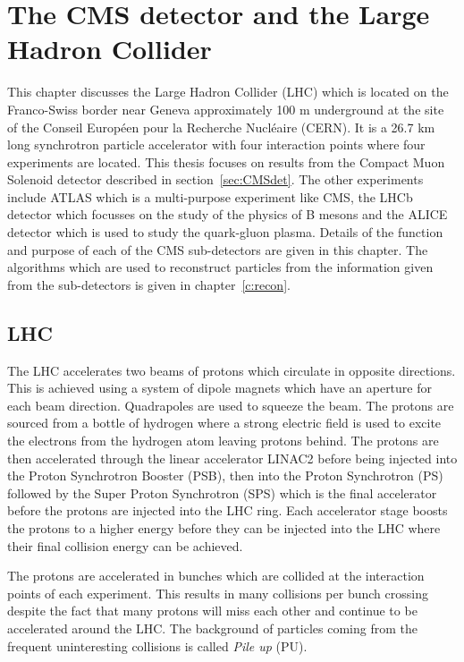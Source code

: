 \chapter{The CMS detector and the Large Hadron Collider}
\label{c:det}
This chapter discusses the Large Hadron Collider (LHC) which is located on the Franco-Swiss border near Geneva approximately 100 m underground at the site of the Conseil Europ\'{e}en pour la Recherche Nucl\'{e}aire (CERN). It is a 26.7 km long synchrotron particle accelerator with four interaction points where four experiments are located.  This thesis focuses on results from the Compact Muon Solenoid detector described in section~\ref{sec:CMSdet}. The other experiments include ATLAS which is a multi-purpose experiment like CMS, the LHCb detector which focusses on the study of the physics of B mesons and the ALICE detector which is used to study the quark-gluon plasma. Details of the function and purpose of each of the CMS sub-detectors are given in this chapter. The algorithms which are used to reconstruct particles from the information given from the sub-detectors is given in chapter~\ref{c:recon}.

\section{LHC}

The LHC accelerates two beams of protons which circulate in opposite directions.
This is achieved using a system of dipole magnets which have an aperture for each beam direction. Quadrapoles are used to squeeze the beam.
The protons are sourced from a bottle of hydrogen where a strong electric field is used to excite the electrons from the hydrogen atom leaving protons behind. The protons are then accelerated through the linear accelerator LINAC2 before being injected into the Proton Synchrotron Booster (PSB), then into the Proton Synchrotron (PS) followed by the Super Proton Synchrotron (SPS) which is the final accelerator before the protons are injected into the LHC ring. Each accelerator stage boosts the protons to a higher energy before they can be injected into the LHC where their final collision energy can be achieved.


The protons are accelerated in bunches which are collided at the interaction points of each experiment. This results in many collisions per bunch crossing despite the fact that many protons will miss each other and continue to be accelerated around the LHC. The background of particles coming from the frequent uninteresting collisions is called \emph{Pile up} (PU).

